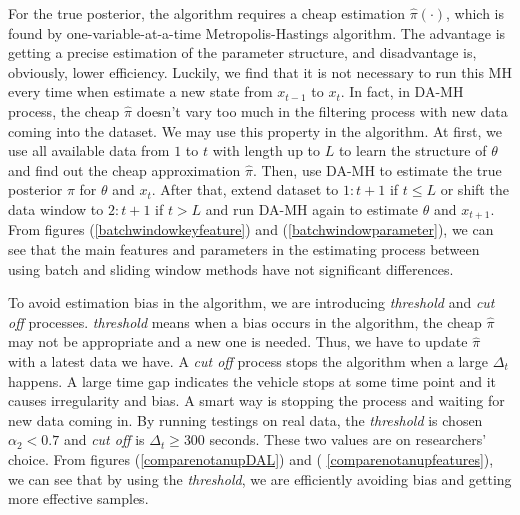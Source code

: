 For the true posterior, the algorithm requires a cheap estimation $\hat{\pi}(\cdot)$, which is found by one-variable-at-a-time Metropolis-Hastings algorithm. The advantage is getting a precise estimation of the parameter structure, and disadvantage is, obviously, lower efficiency. Luckily, we find that it is not necessary to run this MH every time when estimate a new state from $x_{t-1}$ to $x_t$. In fact, in DA-MH process, the cheap $\hat{\pi}$ doesn't vary too much in the filtering process with new data coming into the dataset. We may use this property in the algorithm. At first, we use all available data from $1$ to $t$ with length up to $L$ to learn the structure of $\theta$ and find out the cheap approximation $\hat{\pi}$. Then, use DA-MH to estimate the true posterior $\pi$ for $\theta$ and $x_t$. After that, extend dataset to $1:t+1$ if $t\leq L$ or shift the data window to $2:t+1$ if $t>L$ and run DA-MH again to estimate $\theta$ and $x_{t+1}$. From figures (\ref{batchwindowkeyfeature}) and (\ref{batchwindowparameter}), we can see that the main features and parameters in the estimating process between using batch and sliding window methods have not significant differences. 
 
To avoid estimation bias in the algorithm, we are introducing \textit{threshold} and \textit{cut off} processes. \textit{threshold} means when a bias occurs in the algorithm, the cheap $\hat{\pi}$ may not be appropriate and a new one is needed. Thus, we have to update $\hat{\pi}$ with a latest data we have. A \textit{cut off} process stops the algorithm when a large $\Delta_t$ happens. A large time gap indicates the vehicle stops at some time point and it causes irregularity and bias. A smart way is stopping the process and waiting for new data coming in. By running testings on real data, the \textit{threshold} is chosen $\alpha_2<0.7$ and \textit{cut off} is $\Delta_t\geq 300$ seconds. These two values are on researchers' choice. From figures (\ref{comparenotanupDAL}) and ( \ref{comparenotanupfeatures}), we can see that by using the \textit{threshold}, we are efficiently avoiding bias and getting more effective samples. 


 
